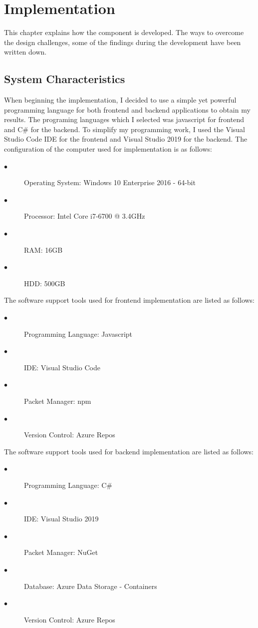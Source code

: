 %
\section{Implementation}\label{sec:implementation}
This chapter explains how the component is developed. The ways to overcome the design challenges, some of the findings during the development have been written down.
%
\subsection{System Characteristics}
When beginning the implementation, I decided to use a simple yet powerful programming language for both frontend and backend applications to obtain my results. The programing languages which I selected was javascript for frontend and C\# for the backend. To simplify my programming work, I used the Visual Studio Code IDE for the frontend and Visual Studio 2019 for the backend. The configuration of the computer used for implementation is as follows:
\begin{description}
	\item [$\bullet$]Operating System: Windows 10 Enterprise 2016 - 64-bit
	\item [$\bullet$]Processor: Intel Core i7-6700 @ 3.4GHz
	\item [$\bullet$]RAM: 16GB
	\item [$\bullet$]HDD: 500GB
\end{description}

The software support tools used for frontend implementation are listed as follows:
\begin{description}
	\item [$\bullet$]Programming Language: Javascript
	\item [$\bullet$]IDE: Visual Studio Code
	\item [$\bullet$]Packet Manager: npm
	\item [$\bullet$]Version Control: Azure Repos
\end{description}

The software support tools used for backend implementation are listed as follows:
\begin{description}
	\item [$\bullet$]Programming Language: C\#
	\item [$\bullet$]IDE: Visual Studio 2019
	\item [$\bullet$]Packet Manager: NuGet
	\item [$\bullet$]Database: Azure Data Storage - Containers
	\item [$\bullet$]Version Control: Azure Repos
\end{description}

